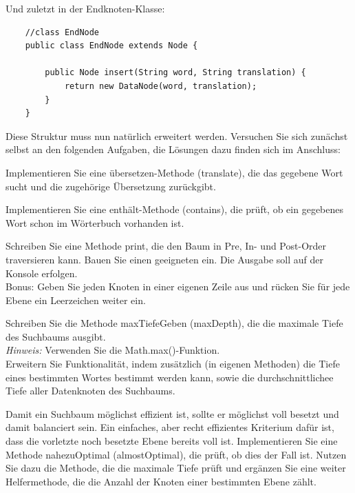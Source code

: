 \documentclass{article}
\begin{document}
Und zuletzt in der Endknoten-Klasse:
\begin{verbatim}
    //class EndNode 
    public class EndNode extends Node {

        public Node insert(String word, String translation) {
            return new DataNode(word, translation);
        }
    }
\end{verbatim}

Diese Struktur muss nun natürlich erweitert werden. Versuchen Sie sich zunächst selbst an den folgenden Aufgaben, die Lösungen dazu finden sich im Anschluss:

\begin{task}{2}
Implementieren Sie eine übersetzen-Methode (translate), die das gegebene Wort sucht und die zugehörige Übersetzung zurückgibt. 
\end{task}

\begin{task}{3}
Implementieren Sie eine enthält-Methode (contains), die prüft, ob ein gegebenes Wort schon im Wörterbuch vorhanden ist. 
\end{task}

\begin{task}{4}
Schreiben Sie eine Methode print, die den Baum in Pre, In- und Post-Order traversieren kann. Bauen Sie einen geeigneten  ein. Die Ausgabe soll auf der Konsole erfolgen. \\
Bonus: Geben Sie jeden Knoten in einer eigenen Zeile aus und rücken Sie für jede Ebene ein Leerzeichen weiter ein. 
\end{task}

\begin{task}{5}
Schreiben Sie die Methode maxTiefeGeben (maxDepth), die die maximale Tiefe des Suchbaums ausgibt. \\
\textit{Hinweis:} Verwenden Sie die Math.max()-Funktion. \\
Erweitern Sie Funktionalität, indem zusätzlich (in eigenen Methoden) die Tiefe eines bestimmten Wortes bestimmt werden kann, sowie die durchschnittlichee Tiefe aller Datenknoten des Suchbaums. 
\end{task}

\begin{task}{6}
Damit ein Suchbaum möglichst effizient ist, sollte er möglichst voll besetzt und damit balanciert sein. Ein einfaches, aber recht effizientes Kriterium dafür ist, dass die vorletzte noch besetzte Ebene bereits voll ist. Implementieren Sie eine Methode nahezuOptimal (almostOptimal), die prüft, ob dies der Fall ist. Nutzen Sie dazu die Methode, die die maximale Tiefe prüft und ergänzen Sie eine weiter Helfermethode, die die Anzahl der Knoten einer bestimmten Ebene zählt. 
\end{task}
\end{document}
